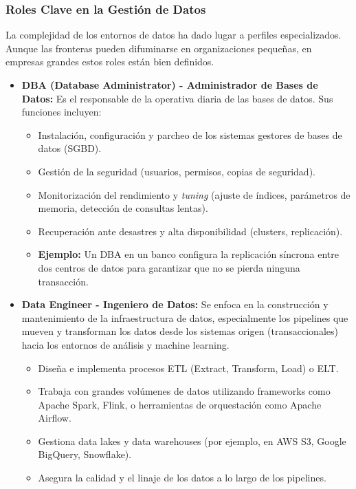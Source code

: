 \documentclass[12pt,a4paper,openany,oneside]{book}
\begin{document}
\subsubsection{Roles Clave en la Gestión de Datos}

La complejidad de los entornos de datos ha dado lugar a perfiles especializados. Aunque las fronteras pueden difuminarse en organizaciones pequeñas, en empresas grandes estos roles están bien definidos.

\begin{itemize}
    \item \textbf{DBA (Database Administrator) - Administrador de Bases de Datos:} Es el responsable de la operativa diaria de las bases de datos. Sus funciones incluyen:
        \begin{itemize}
            \item Instalación, configuración y parcheo de los sistemas gestores de bases de datos (SGBD).
            \item Gestión de la seguridad (usuarios, permisos, copias de seguridad).
            \item Monitorización del rendimiento y \textit{tuning} (ajuste de índices, parámetros de memoria, detección de consultas lentas).
            \item Recuperación ante desastres y alta disponibilidad (clusters, replicación).
            \item \textbf{Ejemplo:} Un DBA en un banco configura la replicación síncrona entre dos centros de datos para garantizar que no se pierda ninguna transacción.
        \end{itemize}
    \item \textbf{Data Engineer - Ingeniero de Datos:} Se enfoca en la construcción y mantenimiento de la infraestructura de datos, especialmente los pipelines que mueven y transforman los datos desde los sistemas origen (transaccionales) hacia los entornos de análisis y machine learning.
        \begin{itemize}
            \item Diseña e implementa procesos ETL (Extract, Transform, Load) o ELT.
            \item Trabaja con grandes volúmenes de datos utilizando frameworks como Apache Spark, Flink, o herramientas de orquestación como Apache Airflow.
            \item Gestiona data lakes y data warehouses (por ejemplo, en AWS S3, Google BigQuery, Snowflake).
            \item Asegura la calidad y el linaje de los datos a lo largo de los pipelines.

\end{itemize}
\end{itemize}
\end{document}

